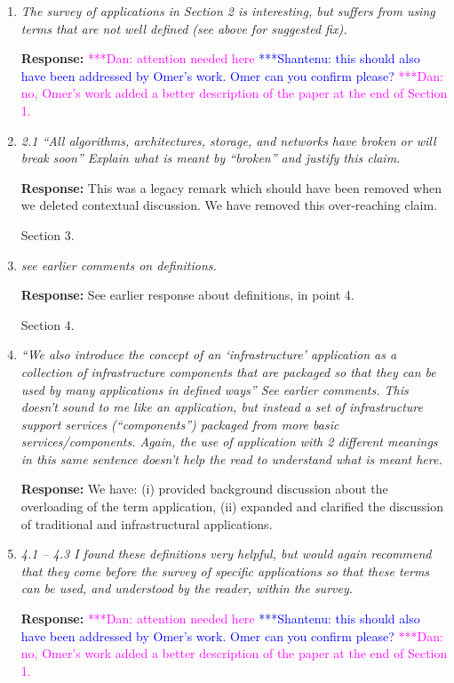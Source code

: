 \documentclass{article}
\newcommand{\katznote}[1]{{\textcolor{magenta} { ***Dan: #1 }}}
\newcommand{\jhanote}[1]{ {\textcolor{blue} { ***Shantenu: #1 }}}
\newcommand{\katznote}[1]{}
\newcommand{\jhanote}[1]{}
\begin{document}
\begin{enumerate}
\item \emph{The survey of applications in Section 2 is interesting, but suffers from using terms that are not well defined (see above for suggested fix).}

\textbf{Response:} \katznote{attention needed here}\jhanote{this should also have been addressed by Omer's work. Omer can you confirm please?} \katznote{no, Omer's work added a better description of the paper at the end of Section 1.}

\item \emph{2.1 ``All algorithms, architectures, storage, and networks have broken or will break soon'' Explain what is meant by ``broken'' and justify this claim.} 

  \textbf{Response:} This was a legacy remark which should have been removed when we deleted contextual discussion. We have removed this over-reaching claim.

\hspace{-0.7cm}Section 3. 

\item \emph{see earlier comments on definitions.} 

\textbf{Response:} See earlier response about definitions, in point 4.

\hspace{-0.7cm}Section 4. 

\item \emph{``We also introduce the concept of an `infrastructure' application as a collection of infrastructure components that are packaged so that they can be used by many applications in defined ways'' See earlier comments. This doesn't sound to me like an application, but instead a set of infrastructure support services (``components'') packaged from more basic services/components. Again, the use of application with 2 different meanings in this same sentence doesn't help the read to understand what is meant here.}

  \textbf{Response:} We have: (i) provided background discussion about the overloading of the term application, (ii) expanded and clarified the discussion of traditional and infrastructural applications.

\item \emph{4.1 -- 4.3 I found these definitions very helpful, but would again recommend that they come before the survey of specific applications so that these terms can be used, and understood by the reader, within the survey.}

  \textbf{Response:} \katznote{attention needed here}\jhanote{this should also have been addressed by Omer's work. Omer can you confirm please?} \katznote{no, Omer's work added a better description of the paper at the end of Section 1.}


\end{enumerate}

\end{document}
